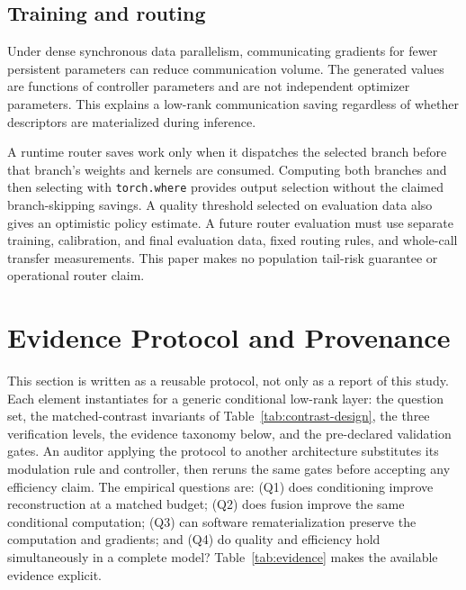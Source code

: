 \subsection{Training and routing}
Under dense synchronous data parallelism, communicating gradients for fewer
persistent parameters can reduce communication volume. The generated values
are functions of controller parameters and are not independent optimizer
parameters. This explains a low-rank communication saving regardless of
whether descriptors are materialized during inference.

A runtime router saves work only when it dispatches the selected branch before
that branch's weights and kernels are consumed. Computing both branches and
then selecting with \texttt{torch.where} provides output selection without the
claimed branch-skipping savings. A quality threshold selected on evaluation
data also gives an optimistic policy estimate. A future router evaluation must
use separate training, calibration, and final evaluation data, fixed routing
rules, and whole-call transfer measurements. This paper makes no population
tail-risk guarantee or operational router claim.

\section{Evidence Protocol and Provenance}\label{sec:protocol}
This section is written as a reusable protocol, not only as a report of this
study. Each element instantiates for a generic conditional low-rank layer:
the question set, the matched-contrast invariants of
Table~\ref{tab:contrast-design}, the three verification levels, the evidence
taxonomy below, and the pre-declared validation gates. An auditor applying
the protocol to another architecture substitutes its modulation rule and
controller, then reruns the same gates before accepting any efficiency claim.
The empirical questions are: (Q1) does conditioning improve reconstruction at a
matched budget; (Q2) does fusion improve the same conditional computation;
(Q3) can software rematerialization preserve the computation and gradients;
and (Q4) do quality and efficiency hold simultaneously in a complete model?
Table~\ref{tab:evidence} makes the available evidence explicit.

